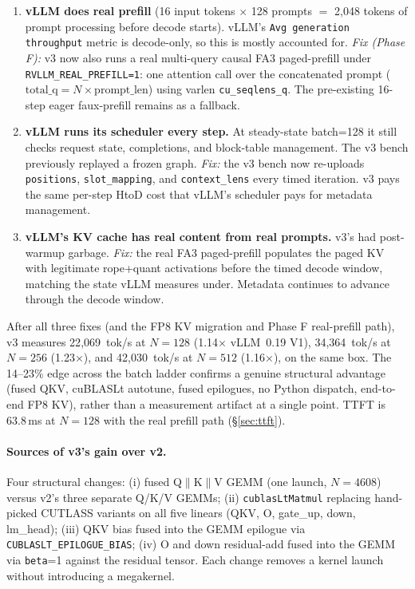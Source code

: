 \begin{enumerate}
\item \textbf{vLLM does real prefill} (16 input tokens $\times$ 128 prompts $=$
  2{,}048 tokens of prompt processing before decode starts). vLLM's
  \texttt{Avg generation throughput} metric is decode-only, so this is
  mostly accounted for. \emph{Fix (Phase F):} v3 now also runs a real
  multi-query causal FA3 paged-prefill under \texttt{RVLLM\_REAL\_PREFILL=1}:
  one attention call over the concatenated prompt ($\text{total\_q}\!=\!N\!\times\!\text{prompt\_len}$)
  using varlen \texttt{cu\_seqlens\_q}. The pre-existing 16-step eager
  faux-prefill remains as a fallback.
\item \textbf{vLLM runs its scheduler every step.} At steady-state batch=128
  it still checks request state, completions, and block-table management.
  The v3 bench previously replayed a frozen graph. \emph{Fix:} the v3
  bench now re-uploads \texttt{positions}, \texttt{slot\_mapping}, and
  \texttt{context\_lens} every timed iteration. v3 pays the same per-step
  HtoD cost that vLLM's scheduler pays for metadata management.
\item \textbf{vLLM's KV cache has real content from real prompts.} v3's
  had post-warmup garbage. \emph{Fix:} the real FA3 paged-prefill populates
  the paged KV with legitimate rope+quant activations before the timed
  decode window, matching the state vLLM measures under. Metadata
  continues to advance through the decode window.
\end{enumerate}

After all three fixes (and the FP8 KV migration and Phase F real-prefill
path), v3 measures 22{,}069~tok/s at $N\!=\!128$ (1.14$\times$ vLLM~0.19 V1),
34{,}364~tok/s at $N\!=\!256$ (1.23$\times$), and 42{,}030~tok/s at
$N\!=\!512$ (1.16$\times$), on the same box. The 14--23\% edge across the
batch ladder confirms a genuine structural advantage (fused QKV, cuBLASLt
autotune, fused epilogues, no Python dispatch, end-to-end FP8 KV),
rather than a measurement artifact at a single point. TTFT is 63.8\,ms
at $N\!=\!128$ with the real prefill path (\S\ref{sec:ttft}).

\paragraph{Sources of v3's gain over v2.}
Four structural changes: (i) fused Q$\|$K$\|$V GEMM (one launch,
$N\!=\!4608$) versus v2's three separate Q/K/V GEMMs; (ii)
\texttt{cublasLtMatmul} replacing hand-picked CUTLASS variants on all
five linears (QKV, O, gate\_up, down, lm\_head); (iii) QKV bias fused
into the GEMM epilogue via \texttt{CUBLASLT\_EPILOGUE\_BIAS}; (iv) O and
down residual-add fused into the GEMM via \texttt{beta}=1 against the
residual tensor. Each change removes a kernel launch without introducing
a megakernel.

